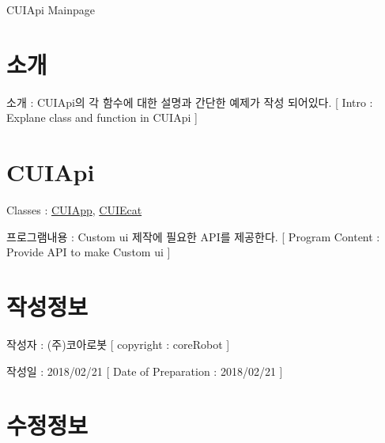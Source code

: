 C\-U\-I\-Api Mainpage \hypertarget{index_intro}{}\section{소개}\label{index_intro}

\begin{DoxyItemize}
\item 소개 \-: C\-U\-I\-Api의 각 함수에 대한 설명과 간단한 예제가 작성 되어있다. \mbox{[} Intro \-: Explane class and function in C\-U\-I\-Api \mbox{]} 
\end{DoxyItemize}\hypertarget{index_CUIApi}{}\section{C\-U\-I\-Api}\label{index_CUIApi}

\begin{DoxyItemize}
\item Classes \-: \hyperlink{classCUIApp}{C\-U\-I\-App}, \hyperlink{classCUIEcat}{C\-U\-I\-Ecat}
\item 프로그램내용 \-: Custom ui 제작에 필요한 A\-P\-I를 제공한다. \mbox{[} Program Content \-: Provide A\-P\-I to make Custom ui \mbox{]} 
\end{DoxyItemize}\hypertarget{index_CREATEINFO}{}\section{작성정보}\label{index_CREATEINFO}

\begin{DoxyItemize}
\item 작성자 \-: (주)코아로봇 \mbox{[} copyright \-: core\-Robot \mbox{]}
\item 작성일 \-: 2018/02/21 \mbox{[} Date of Preparation \-: 2018/02/21 \mbox{]} 
\end{DoxyItemize}\hypertarget{index_MODIFYINFO}{}\section{수정정보}\label{index_MODIFYINFO}

